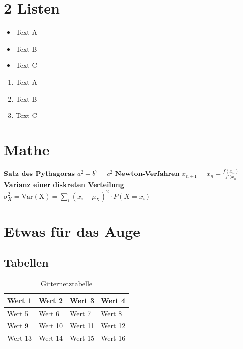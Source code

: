 \documentclass{scrreprt}
\begin{document}
	\chapter{2 Listen}
	
\begin{itemize}
	\item Text A
	\item Text B
	\item Text C
\end{itemize}


\begin{enumerate}
	\item Text A
	\item Text B
	\item Text C
\end{enumerate}

\chapter{Mathe}

\textbf{Satz des Pythagoras} 
\vspace{2pt}
\newline
$ a^{2} + b^{2} = c^{2} $
\vspace{10pt}
\newline
\textbf{Newton-Verfahren} 
\vspace{2pt}
\newline
$ x_{n+1} = x_{n} - \frac{f(x_{n})}{f'(x_{n}} $
\vspace{10pt}
\newline
\textbf{Varianz einer diskreten Verteilung} 
\vspace{2pt}
\newline
$ \sigma^2_{X} = \mathrm{Var(X)} = \sum_i (x_i - \mu_{X})^2 \cdot P(X = x_i) $

\chapter{Etwas für das Auge}
\section{Tabellen}

\begin{table}[htbp]
	\caption{Gitternetztabelle}
	\label { Tabelle 1.0}
	\centering
	\begin{tabular}{|l|l|l|l|}
		\hline
		Wert 1 & Wert 2 & Wert 3 & Wert 4 \\ \hline
		Wert 5 & Wert 6 & Wert 7 & Wert 8 \\ \hline
		Wert 9 & Wert 10 & Wert 11 & Wert 12  \\ \hline
		Wert 13 & Wert 14 & Wert 15 & Wert 16  \\ \hline
	\end{tabular}
	
\end{table}
\end{document}
